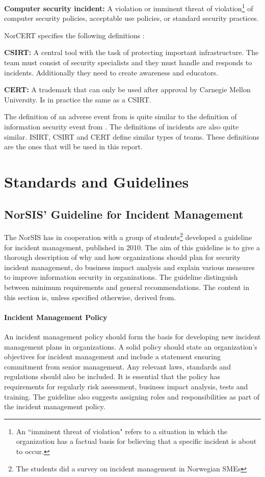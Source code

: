 \textbf{Computer security incident:} A violation or imminent threat of violation\footnote{An ``imminent threat of violation" refers to a situation in which the organization has a factual basis for believing that a specific incident is about to occur.} of computer security policies, acceptable use policies, or standard security practices.

\acs{NorCERT} specifies the following definitions \cite{NorCERT3Kvartal2012}:

\textbf{\ac{CSIRT}:} A central tool with the task of protecting important infrastructure. The team must consist of security specialists and they must handle and responds to incidents. Additionally they need to create awareness and educators.

\textbf{\ac{CERT}:} A trademark that can only be used after approval by Carnegie Mellon University. Is in practice the same as a \acs{CSIRT}.

The definition of an adverse event from \cite{nist800-61} is quite similar to the definition of information security event from \cite{ISO/IEC27000}. The definitions of incidents are also quite similar. \ac{ISIRT}, \ac{CSIRT} and \ac{CERT} define similar types of teams. These definitions are the ones that will be used in this report.

\section{Standards and Guidelines}



\subsection{NorSIS' Guideline for Incident Management}
The \ac{NorSIS} has in cooperation with a group of students\footnote{The students did a survey on incident management in Norwegian \acsp{SME}\cite{sand2010hendelseshaandtering}} developed a guideline for incident management, published in 2010\cite{norsisveiledning}. The aim of this guideline is to give a thorough description of why and how organizations should plan for security incident management, do business impact analysis and explain various measures to improve information security in organizations. The guideline distinguish between minimum requirements and general recommendations. The content in this section is, unless specified otherwise, derived from\cite{norsisveiledning}.

\paragraph{Incident Management Policy} 
An incident management policy should form the basis for developing new incident management plans in organizations. A solid policy should state an organization's objectives for incident management and include a statement ensuring commitment from senior management. Any relevant laws, standards and regulations should also be included. It is essential that the policy has requirements for regularly risk assessment, business impact analysis, tests and training. The guideline also suggests assigning roles and responsibilities as part of the incident management policy.

